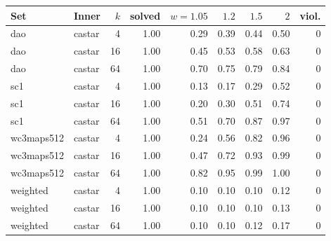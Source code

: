 \begin{tabular}{llr r rrrr r}\toprule
Set & Inner & $k$ & solved & $w{=}1.05$ & $1.2$ & $1.5$ & $2$ & viol.\\\midrule
dao & castar & 4 & 1.00 & 0.29 & 0.39 & 0.44 & 0.50 & 0\\
dao & castar & 16 & 1.00 & 0.45 & 0.53 & 0.58 & 0.63 & 0\\
dao & castar & 64 & 1.00 & 0.70 & 0.75 & 0.79 & 0.84 & 0\\
sc1 & castar & 4 & 1.00 & 0.13 & 0.17 & 0.29 & 0.52 & 0\\
sc1 & castar & 16 & 1.00 & 0.20 & 0.30 & 0.51 & 0.74 & 0\\
sc1 & castar & 64 & 1.00 & 0.51 & 0.70 & 0.87 & 0.97 & 0\\
wc3maps512 & castar & 4 & 1.00 & 0.24 & 0.56 & 0.82 & 0.96 & 0\\
wc3maps512 & castar & 16 & 1.00 & 0.47 & 0.72 & 0.93 & 0.99 & 0\\
wc3maps512 & castar & 64 & 1.00 & 0.82 & 0.95 & 0.99 & 1.00 & 0\\
weighted & castar & 4 & 1.00 & 0.10 & 0.10 & 0.10 & 0.12 & 0\\
weighted & castar & 16 & 1.00 & 0.10 & 0.10 & 0.10 & 0.13 & 0\\
weighted & castar & 64 & 1.00 & 0.10 & 0.10 & 0.12 & 0.17 & 0\\
\bottomrule\end{tabular}
